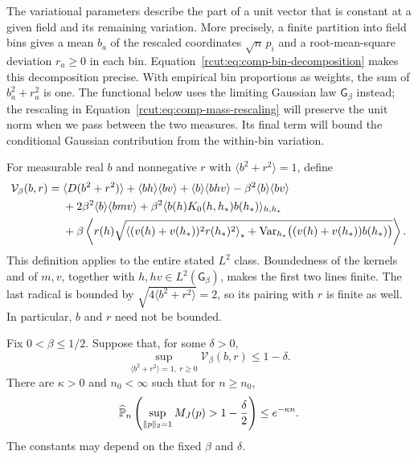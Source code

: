 The variational parameters describe the part of a unit vector that is
constant at a given field and its remaining variation.  More precisely,
a finite partition into field bins gives a mean $b_a$ of the rescaled
coordinates $\sqrt n\,p_i$ and a root-mean-square deviation $r_a\ge0$
in each bin.  Equation~\eqref{rcut:eq:comp-bin-decomposition} makes this
decomposition precise.  With empirical bin proportions as weights, the
sum of $b_a^2+r_a^2$ is one.  The functional below uses the limiting
Gaussian law $\mathsf G_\beta$ instead; the rescaling in
Equation~\eqref{rcut:eq:comp-mass-rescaling} will preserve the unit norm
when we pass between the two measures.  Its final term will bound the
conditional Gaussian contribution from the within-bin variation.

For measurable real $b$ and nonnegative $r$ with
$\langle b^2+r^2\rangle=1$, define
\begin{align}
 \mathcal V_\beta(b,r)
 ={}&\langle D(b^2+r^2)\rangle
       +\langle bh\rangle\langle bv\rangle
       +\langle b\rangle\langle bhv\rangle
       -\beta^2\langle b\rangle\langle bv\rangle \notag\\
    &+2\beta^2\langle b\rangle\langle bmv\rangle
       +\beta^2\langle b(h)K_0(h,h_*)b(h_*)\rangle_{h,h_*}
       \notag\\
    &+\beta\left\langle r(h)
       \sqrt{\left\langle(v(h)+v(h_*))^2r(h_*)^2\right\rangle_*
        +\Var_{h_*}\bigl((v(h)+v(h_*))b(h_*)\bigr)}
       \right\rangle.
 \label{rcut:eq:variational}
\end{align}
This definition applies to the entire stated $L^2$ class.  Boundedness
of the kernels and of $m,v$, together with
$h,hv\in L^2(\mathsf G_\beta)$, makes the first two lines finite.
The last radical is bounded by
$\sqrt{4\langle b^2+r^2\rangle}=2$, so its pairing with $r$ is finite
as well.  In particular, $b$ and $r$ need not be bounded.

\begin{proposition}
 \label{rcut:prop:planted-comparison}
 Fix $0<\beta\le1/2$.  Suppose that, for some $\delta>0$,
 \[
  \sup_{\langle b^2+r^2\rangle=1,\ r\ge0}
       \mathcal V_\beta(b,r)\le1-\delta.
 \]
 There are $\kappa>0$ and $n_0<\infty$ such that for $n\ge n_0$,
 \begin{equation}
  \widehat\P_n\left(
    \sup_{\|p\|_2=1}M_J(p)>1-\frac\delta2\right)
       \le e^{-\kappa n}.
  \label{rcut:eq:comp-exponential-conclusion}
 \end{equation}
 The constants may depend on the fixed $\beta$ and $\delta$.
\end{proposition}

